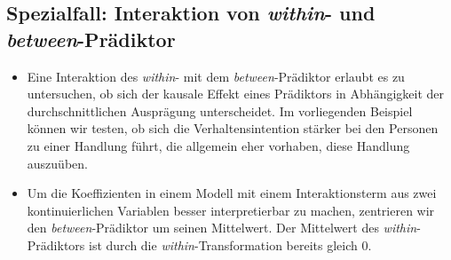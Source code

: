 \documentclass[
]{book}
\newenvironment{Shaded}{\begin{snugshade}}{\end{snugshade}}
\newcommand{\CommentTok}[1]{\textcolor[rgb]{0.56,0.35,0.01}{\textit{#1}}}
\newcommand{\DataTypeTok}[1]{\textcolor[rgb]{0.13,0.29,0.53}{#1}}
\newcommand{\KeywordTok}[1]{\textcolor[rgb]{0.13,0.29,0.53}{\textbf{#1}}}
\newcommand{\NormalTok}[1]{#1}
\newcommand{\OperatorTok}[1]{\textcolor[rgb]{0.81,0.36,0.00}{\textbf{#1}}}
\newcommand{\OtherTok}[1]{\textcolor[rgb]{0.56,0.35,0.01}{#1}}
\newcommand{\StringTok}[1]{\textcolor[rgb]{0.31,0.60,0.02}{#1}}
\providecommand{\tightlist}{%
  \setlength{\itemsep}{0pt}\setlength{\parskip}{0pt}}
\begin{document}
\hypertarget{spezialfall-interaktion-von-within--und-between-pruxe4diktor}{%
\subsection*{\texorpdfstring{Spezialfall: Interaktion von \emph{within}- und \emph{between}-Prädiktor}{Spezialfall: Interaktion von within- und between-Prädiktor}}\label{spezialfall-interaktion-von-within--und-between-pruxe4diktor}}

\begin{itemize}
\tightlist
\item
  Eine Interaktion des \emph{within}- mit dem \emph{between}-Prädiktor erlaubt es zu untersuchen, ob sich der kausale Effekt eines Prädiktors in Abhängigkeit der durchschnittlichen Ausprägung unterscheidet. Im vorliegenden Beispiel können wir testen, ob sich die Verhaltensintention stärker bei den Personen zu einer Handlung führt, die allgemein eher vorhaben, diese Handlung auszuüben.
\item
  Um die Koeffizienten in einem Modell mit einem Interaktionsterm aus zwei kontinuierlichen Variablen besser interpretierbar zu machen, zentrieren wir den \emph{between}-Prädiktor um seinen Mittelwert. Der Mittelwert des \emph{within}-Prädiktors ist durch die \emph{within}-Transformation bereits gleich 0.
\end{itemize}

\begin{Shaded}
\end{Shaded}
\end{document}

